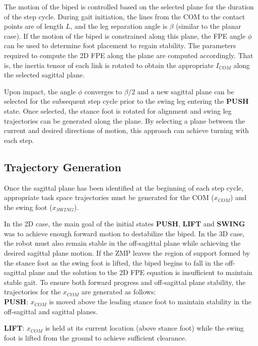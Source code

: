The motion of the biped is controlled based on the selected plane for the duration of the step cycle. During gait initiation, the lines from the COM to the contact points are of length $L$, and the leg separation angle is $\beta$ (similar to the planar case). If the motion of the biped is constrained along this plane, the FPE angle $\phi$ can be used to determine foot placement to regain stability. The parameters required to compute the 2D FPE along the plane are computed accordingly. That is, the inertia tensor of each link is rotated to obtain the appropriate $I_{COM}$ along the selected sagittal plane.

Upon impact, the angle $\phi$ converges to $\beta/2$ and a new sagittal plane can be selected for the subsequent step cycle prior to the swing leg entering the \textbf{PUSH} state. Once selected, the stance foot is rotated for alignment and swing leg trajectories can be generated along the plane. By selecting a plane between the current and desired directions of motion, this approach can achieve turning with each step.


\subsection{Trajectory Generation} %
\label{sub:trajectory_generation}
Once the sagittal plane has been identified at the beginning of each step cycle, appropriate task space trajectories must be generated for the COM ($x_{COM}$) and the swing foot ($x_{SWING}$).

In the 2D case, the main goal of the initial states \textbf{PUSH}, \textbf{LIFT} and \textbf{SWING} was to achieve enough forward motion to destabilize the biped. In the 3D case, the robot must also remain stable in the off-sagittal plane while achieving the desired sagittal plane motion. If the ZMP leaves the region of support formed by the stance foot as the swing foot is lifted, the biped begins to fall in the off-sagittal plane and the solution to the 2D FPE equation is insufficient to maintain stable gait. To ensure both forward progress and off-sagittal plane stability, the trajectories for the $x_{COM}$ are generated as follows: \\

\textbf{PUSH}: $x_{COM}$ is moved above the leading stance foot to maintain stability in the off-sagittal and sagittal planes.

\textbf{LIFT}: $x_{COM}$ is held at its current location (above stance foot) while the swing foot is lifted from the ground to achieve sufficient clearance.

